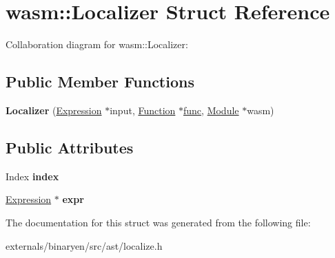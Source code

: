 \hypertarget{structwasm_1_1_localizer}{}\section{wasm\+:\+:Localizer Struct Reference}
\label{structwasm_1_1_localizer}


Collaboration diagram for wasm\+:\+:Localizer\+:
\subsection*{Public Member Functions}
\begin{DoxyCompactItemize}
\item 
\mbox{\label{structwasm_1_1_localizer_a1c90bf3c467b6d20de4226b4243d4d45}} 
{\bfseries Localizer} (\mbox{\hyperlink{classwasm_1_1_expression}{Expression}} $\ast$input, \mbox{\hyperlink{classwasm_1_1_function}{Function}} $\ast$\mbox{\hyperlink{structfunc}{func}}, \mbox{\hyperlink{classwasm_1_1_module}{Module}} $\ast$wasm)
\end{DoxyCompactItemize}
\subsection*{Public Attributes}
\begin{DoxyCompactItemize}
\item 
\mbox{\label{structwasm_1_1_localizer_ae5c771947e18173e13b7892bb2554779}} 
Index {\bfseries index}
\item 
\mbox{\label{structwasm_1_1_localizer_abd215505a2dce179f9976f18ef6babaa}} 
\mbox{\hyperlink{classwasm_1_1_expression}{Expression}} $\ast$ {\bfseries expr}
\end{DoxyCompactItemize}


The documentation for this struct was generated from the following file\+:\begin{DoxyCompactItemize}
\item 
externals/binaryen/src/ast/localize.\+h\end{DoxyCompactItemize}
